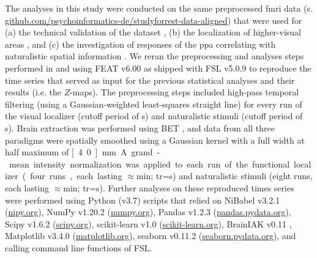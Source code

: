 The analyses in this study were conducted on the same preprocessed \ac{fmri}
data (s.
\href{https://github.com/psychoinformatics-de/studyforrest-data-aligned
}{\url{github.com/psychoinformatics-de/studyforrest-data-aligned}}) that were
used for
%
(a) the technical validation of the dataset \citep{hanke2016simultaneous},
%
(b) the localization of higher-visual areas \citep{sengupta2016extension}, and
%
(c) the investigation of responses of the \ac{ppa} correlating with naturalistic
spatial information \citep{haeusler2022processing}.
%
We reran the preprocessing and analyses steps performed in
\citet{sengupta2016extension} and \citet{haeusler2022processing} using FEAT
v6.00 \citep[FMRI Expert Analysis Tool;][]{woolrich2001autocorr} as shipped with
FSL v5.0.9 \citep[\href{https://www.fmrib.ox.ac.uk/fsl}{FMRIB's Software
Library;}][]{smith2004fsl} to reproduce the time series that served as input for
the previous statistical analyses and their results (i.e. the $Z$-maps).
The preprocessing steps included high-pass temporal filtering (using a
Gaussian-weighted least-squares straight line) for every run of the visual
localizer (cutoff period of \unit[100]{s}) and naturalistic stimuli (cutoff
period of \unit[150]{s}).
Brain extraction was performed using BET \citep{smith2002bet}, and data from all
three paradigms were spatially smoothed using a Gaussian kernel with a full
width at half maximum of \unit[4.0]{mm}.
A grand-mean intensity normalization was applied to each run of the functional
localizer (four runs, each lasting $\approx$\unit[5]{min}; \ac{tr}=\unit[2]{s})
and naturalistic stimuli (eight runs, each lasting $\approx$\unit[15]{min};
\ac{tr}=\unit[2]{s}).
%
Further analyses on these reproduced times series were performed using Python
(v3.7) scripts that relied on
%
NiBabel v3.2.1 (\href{https://nipy.org}{\url{nipy.org}}),
%
NumPy v1.20.2 (\href{https://numpy.org}{\url{numpy.org}}),
%
Pandas v1.2.3 (\href{https://pandas.pydata.org}{\url{pandas.pydata.org}}),
%
Scipy v1.6.2 (\href{https://scipy.org}{\url{scipy.org}}),
%
scikit-learn v1.0 (\href{https://scikit-learn.org}{\url{scikit-learn.org}}),
%
BrainIAK v0.11
\citep[\href{https://brainiak.org}{\url{brainiak.org}}][]{kumar2020brainiak,
kumar2020brainiaktutorial},
%
Matplotlib v3.4.0 (\href{https://matplotlib.org}{\url{matplotlib.org}}),
%
seaborn v0.11.2 (\href{https://seaborn.pydata.org}{\url{seaborn.pydata.org}}),
%
and calling command line functions of FSL.


